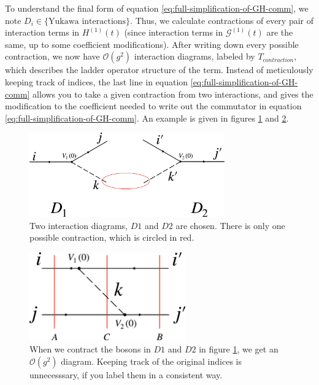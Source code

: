 To understand the final form of equation \ref{eq:full-simplification-of-GH-comm}, we note $D_i \in \{\text{Yukawa interactions} \}$. 
Thus, we calculate contractions of every pair of interaction terms in $H^{(1)}(t)$ (since interaction terms in $\mathcal{G}^{(1)}(t)$ are the same, up to some coefficient modifications).
After writing down every possible contraction, we now have $\mathcal{O}(g^2)$ interaction diagrams, labeled by $T_{contraction}$, which describes the ladder operator structure of the term. 
Instead of meticulously keeping track of indices, the last line in equation \ref{eq:full-simplification-of-GH-comm} allows you to take a given contraction from two interactions, and gives the modification to the coefficient needed to write out the commutator in equation \ref{eq:full-simplification-of-GH-comm}.
An example is given in figures \ref{fig:D1D2} and \ref{fig:contraction}.

\begin{figure}
    \includegraphics[width = 0.75\textwidth]{figures/D1D2.pdf}
    \caption{Two interaction diagrams, $D1$ and $D2$ are chosen. There is only one possible contraction, which is circled in red.}
    \label{fig:D1D2}
\end{figure}

\begin{figure}
    \includegraphics[width = 0.6\textwidth]{figures/contraction.pdf}
    \caption{When we contract the bosons in $D1$ and $D2$ in figure \ref{fig:D1D2}, we get an $\mathcal{O}(g^2)$ diagram. Keeping track of the original indices is unnecesssary, if you label them in a consistent way.}
    \label{fig:contraction}
\end{figure}

